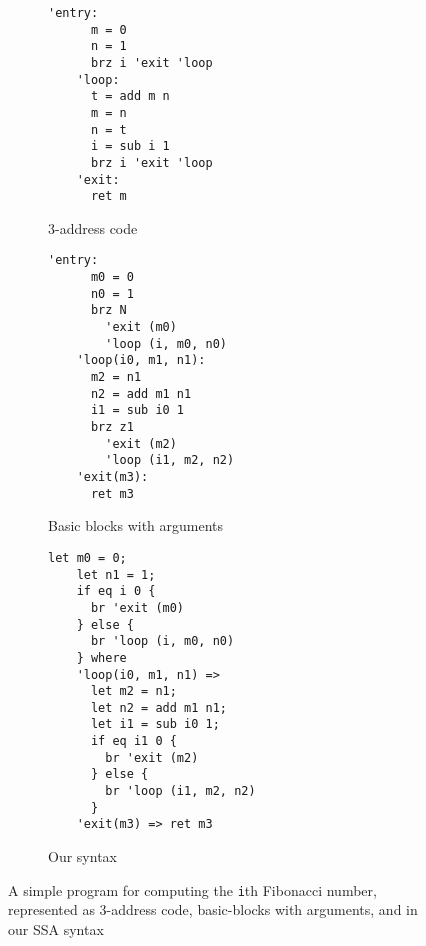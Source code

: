 \documentclass[acmsmall,screen,review]{acmart}
\begin{document}
\begin{figure}
  \centering
  \begin{subfigure}[t]{0.33\textwidth}
    \begin{BVerbatim}[baseline=t, gobble=3]
    'entry:
      m = 0
      n = 1
      brz i 'exit 'loop
    'loop:
      t = add m n
      m = n
      n = t
      i = sub i 1
      brz i 'exit 'loop
    'exit:
      ret m
    \end{BVerbatim}
    \caption{3-address code}
    \label{fig:3-addr}
  \end{subfigure}
  \begin{subfigure}[t]{0.32\textwidth}
    \begin{BVerbatim}[baseline=t, gobble=3]
      'entry:
      m0 = 0
      n0 = 1
      brz N 
        'exit (m0) 
        'loop (i, m0, n0)
    'loop(i0, m1, n1):
      m2 = n1
      n2 = add m1 n1
      i1 = sub i0 1
      brz z1 
        'exit (m2) 
        'loop (i1, m2, n2)
    'exit(m3):
      ret m3
    \end{BVerbatim}
    \caption{Basic blocks with arguments}
    \label{fig:bb-arg}
  \end{subfigure}
  \begin{subfigure}[t]{0.33\textwidth}
    \begin{BVerbatim}[baseline=t, gobble=3]
    let m0 = 0;
    let n1 = 1;
    if eq i 0 {
      br 'exit (m0)
    } else {
      br 'loop (i, m0, n0)
    } where
    'loop(i0, m1, n1) =>
      let m2 = n1;
      let n2 = add m1 n1;
      let i1 = sub i0 1;
      if eq i1 0 {
        br 'exit (m2)
      } else {
        br 'loop (i1, m2, n2)
      }
    'exit(m3) => ret m3
    \end{BVerbatim}
    \caption{Our syntax}
    \label{fig:our-syn}
  \end{subfigure}
  \caption{A simple program for computing the \texttt{i}th Fibonacci number,
  represented as 3-address code, basic-blocks with arguments, and in our SSA
  syntax} 
  \Description{}
  \label{fig:ssa-examples}
\end{figure}
\end{document}
